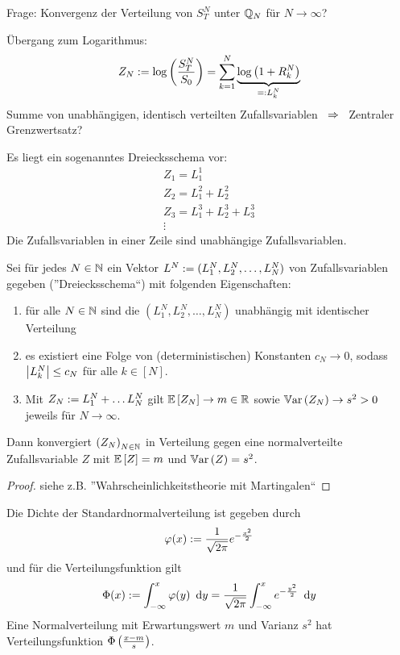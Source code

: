 Frage: Konvergenz der Verteilung von $S_T^N$ unter $\Q_N$ für $N \to \infty$?

Übergang zum Logarithmus:
\begin{equation*}
Z_N \defeq \log\brackets{\frac{S_T^N}{S_0}} = \sum_{k = 1}^N \underbrace{\log\brackets{1 + R_k^N}}_{\defqe L_k^N}
\end{equation*}
Summe von unabhängigen, identisch verteilten Zufallsvariablen $\follows$ Zentraler Grenzwertsatz?

Es liegt ein sogenanntes Dreiecksschema vor:
\begin{align*}
Z_1 = L_1^1 \\
Z_2 = L_1^2 + L_2^2 \\
Z_3 = L_1^3 + L_2^3 + L_3^3 \\
\vdots
\end{align*}
Die Zufallsvariablen in einer Zeile sind unabhängige Zufallsvariablen.

\begin{theorem} %
	\label{theorem: 3.1}
	Sei für jedes $N \in \N$ ein Vektor $L^N \defeq (L_1^N, L_2^N, \dots, L_N^N)$ von Zufallsvariablen gegeben (''Dreiecksschema``) mit folgenden Eigenschaften:
	\begin{enumerate}[label = (\alph*), nolistsep]
		\item für alle $N \in \N$ sind die $(L_1^N, L_2^N, \dots, L_N^N)$ unabhängig mit identischer Verteilung
		\item es existiert eine Folge von (deterministischen) Konstanten $c_N \to 0$, sodass $\abs{L_k^N} \le c_N$ für alle $k \in [N]$.
		\item Mit $Z_N \defeq L_1^N + \dots L_N^N$ gilt $\EW[Z_N] \to m \in \R$ sowie $\Var[Z_N] \to s^2 > 0$ jeweils für $N \to \infty$.
	\end{enumerate}
	Dann konvergiert $\folge{Z_N}{N \in \N}$ in Verteilung gegen eine normalverteilte Zufallsvariable $Z$ mit $\EW[Z] = m$ und $\Var[Z] = s^2$. 
\end{theorem}
\begin{proof}
	siehe z.B. ''Wahrscheinlichkeitstheorie mit Martingalen``
\end{proof}

\begin{*bemerkung_inline}
	Die Dichte der Standardnormalverteilung ist gegeben durch
	\begin{equation*}
	\phi(x) \defeq \frac{1}{\sqrt{2 \pi}} e^{-\frac{x^2}{2}}
	\end{equation*}
	und für die Verteilungsfunktion gilt
	\begin{equation*}
	\Phi(x) \defeq \int_{-\infty}^x \phi(y) \diffskip{y} = \frac{1}{\sqrt{2 \pi}} \int_{-\infty}^x e^{-\frac{y^2}{2}} \diffskip{y}
	\end{equation*}
	Eine Normalverteilung mit Erwartungswert $m$ und Varianz $s^2$ hat Verteilungsfunktion $\Phi\brackets{\frac{x-m}{s}}$.
\end{*bemerkung_inline}

